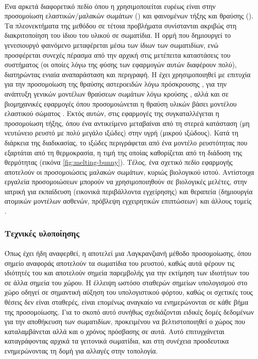 \paragraph{} Ένα αρκετά διαφορετικό πεδίο όπου η  χρησιμοποιείται ευρέως είναι
στην προσομοίωση ελαστικών/μαλακών σωμάτων () και φαινομένων
τήξης και θραύσης (). Τα πλεονεκτήματα της μεθόδου σε τέτοια προβλήματα
συνίστανται ακριβώς στη διακριτοποίηση του ίδιου του υλικού σε σωματίδια. Η ορμή που
δημιουργεί το γενεσιουργό φαινόμενο μεταφέρεται μέσω των ίδιων των σωματιδίων, ενώ
προσφέρεται συνεχές πέρασμα από την αρχική στις μετέπειτα καταστάσεις του συστήματος (οι
οποίες λόγω της φύσης των εφαρμογών αυτών διαφέρουν πολύ), διατηρώντας ενιαία αναπαράσταση
και περιγραφή. Η  έχει χρησιμοποιηθεί με επιτυχία για την προσομοίωση της θραύσης
αστεροειδών λόγω πρόσκρουσης \cite{Benz199498}, για την ανάπτυξη γενικών μοντέλων θραύσεων
σωμάτων λόγω κρούσης \cite{Benz1995253}, αλλά και σε βιομηχανικές εφαρμογές όπου
προσομοιώνεται η θραύση υλικών βάσει μοντέλου ελαστικού σώματος \cite{Das201047}. Εκτός
αυτών, στις εφαρμογές της  συγκαταλλέγεται η προσομοίωση τήξης, όπου ένα
αντικείμενο μεταβαίναι από τη στερεά κατάσταση (μη νευτώνειο ρευστό με πολύ μεγάλο ιξώδες)
στην υγρή (μικρού ιξώδους). Κατά τη διάρκεια της διαδικασίας, το ιξώδες περιγράφεται από
ένα μοντέλο ρευστότητας που εξαρτάται από τη θερμοκρασία, η τιμή της οποίας καθορίζεται
από τη διάδοση της θερμότητας \cite{paiva2006particle} (εικόνα
\ref{fig:melting-bunny}). Τέλος, ένα σχετικό πεδίο εφαρμογής αποτελούν οι προσομοιώσεις
μαλακών σωμάτων, κυριώς βιολογικού ιστού. Αντίστοιχα εργαλεία προσομοιώσεων μπορούν να
χρησιμοποιηθούν σε βιολογικές μελέτες, στην ιατρική για εκπαίδευση (εικονικά περιβάλλοντα
εγχείρησης) και θεραπεία (δημιουργία ατομικών μοντέλων ασθενών, πρόβλεψη εγχειρητικών
επιπτώσεων) και άλλους τομείς \cite{Hieber20089195}.

\subsubsection{Τεχνικές υλοποίησης}
\label{sssec:implementation-techniques}
\paragraph{} Όπως έχει ήδη αναφερθεί, η  αποτελεί μια Λαγκρανζιανή μέθοδο
προσομοίωσης, όπου σημείο αναφοράς αποτελούν τα σωματίδια του ρευστού, καθώς αυτά φέρουν
τις ιδιότητές του και αποτελούν σημεία παρεμβολής για την εκτίμηση των ιδιοτήτων του σε
άλλα σημεία του χώρου. Η έλλειψη ωστόσο σταθερών σημείων υπολογισμού στο χώρο οδηγεί σε
σημαντική αύξηση του υπολογιστικού φόρτου, καθώς οι σχετικές τους θέσεις δεν είναι
σταθερές, είναι επομένως αναγκαίο να ενημερώνονται σε κάθε βήμα της προσομοίωσης. Για το
σκοπό αυτό συνήθως σχεδιάζονται ειδικές δομές δεδομένων για την αποθήκευση των σωματιδίων,
προκειμένου να βελτιστοποιηθεί ο χώρος που καταλαμβάνεται αλλά και ο χρόνος πρόσβασης σε
αυτά. Αυτό επιτυγχάνεται καταγράφοντας αρχικά τα γειτονικά σωματίδια, και στη συνέχεια
προοδευτικα ενημερώνοντας τη δομή για αλλαγές στην τοπολογία.

